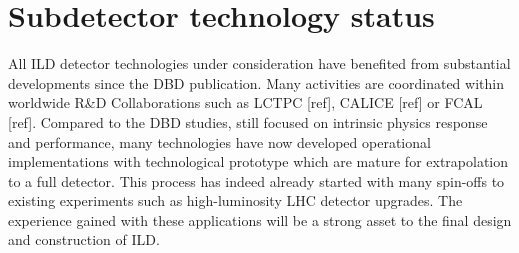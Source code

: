 \section{Subdetector technology status}


All ILD detector technologies under consideration have benefited from substantial developments since the DBD publication. Many activities are coordinated within worldwide R\&D Collaborations such as LCTPC [ref], CALICE [ref] or FCAL [ref]. Compared to the DBD studies, still focused on intrinsic physics response and performance, many technologies have now developed operational implementations 
with technological prototype which are mature for extrapolation to a full detector. This process has indeed already started with many spin-offs to existing experiments such as high-luminosity LHC detector upgrades. The experience gained with these applications will be a strong asset to the final design and construction of ILD.  








